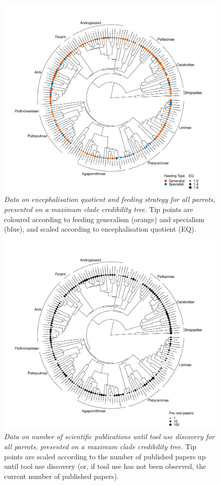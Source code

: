 \documentclass[
  man, donotrepeattitle,floatsintext]{apa6}
\begin{document}
\begin{figure}
\centering
\includegraphics{manuscript_files/figure-latex/plotPhylo2-1.pdf}
\caption{\label{fig:plotPhylo2}\emph{Data on encephalisation quotient and feeding strategy for all parrots, presented on a maximum clade credibility tree.} Tip points are coloured according to feeding generalism (orange) and specialism (blue), and scaled according to encephalisation quotient (EQ).}
\end{figure}

\newpage



\begin{figure}
\centering
\includegraphics{manuscript_files/figure-latex/plotPhylo3-1.pdf}
\caption{\label{fig:plotPhylo3}\emph{Data on number of scientific publications until tool use discovery for all parrots, presented on a maximum clade credibility tree.} Tip points are scaled according to the number of published papers up until tool use discovery (or, if tool use has not been observed, the current number of published papers).}
\end{figure}
\end{document}
